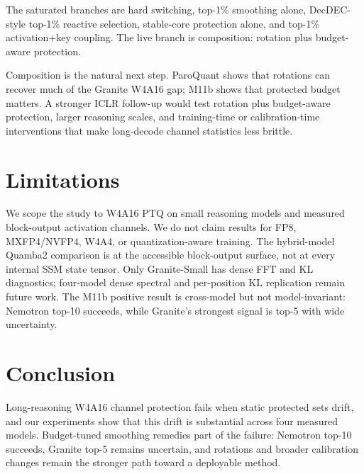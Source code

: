 \documentclass{article}
\begin{document}
The saturated branches are hard switching, top-1\% smoothing alone, DecDEC-style top-1\% reactive selection, stable-core protection alone, and top-1\% activation+key coupling. The live branch is composition: rotation plus budget-aware protection.

Composition is the natural next step. ParoQuant shows that rotations can recover much of the Granite W4A16 gap; M11b shows that protected budget matters. A stronger ICLR follow-up would test rotation plus budget-aware protection, larger reasoning scales, and training-time or calibration-time interventions that make long-decode channel statistics less brittle.

\section{Limitations}

We scope the study to W4A16 PTQ on small reasoning models and measured block-output activation channels. We do not claim results for FP8, MXFP4/NVFP4, W4A4, or quantization-aware training. The hybrid-model Quamba2 comparison is at the accessible block-output surface, not at every internal SSM state tensor. Only Granite-Small has dense FFT and KL diagnostics; four-model dense spectral and per-position KL replication remain future work. The M11b positive result is cross-model but not model-invariant: Nemotron top-10 succeeds, while Granite's strongest signal is top-5 with wide uncertainty.

\section{Conclusion}

Long-reasoning W4A16 channel protection fails when static protected sets drift, and our experiments show that this drift is substantial across four measured models. Budget-tuned smoothing remedies part of the failure: Nemotron top-10 succeeds, Granite top-5 remains uncertain, and rotations and broader calibration changes remain the stronger path toward a deployable method.
\end{document}
